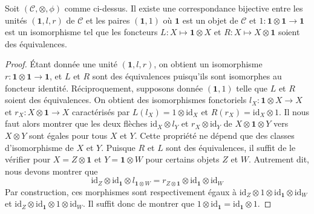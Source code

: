 \begin{lemma}
\label{lemma-monoidal-unit}
Soit $(\mathcal{C}, \otimes, \phi)$ comme ci-dessus. Il existe une
correspondance bijective entre les unités $(\mathbf{1}, l, r)$ de $\mathcal{C}$
et les paires $(\mathbf{1}, 1)$ où $\mathbf{1}$ est un objet de $\mathcal{C}$ et
$1 : \mathbf{1} \otimes \mathbf{1} \to \mathbf{1}$
est un isomorphisme tel que les foncteurs
$L : X \mapsto \mathbf{1} \otimes X$
et $R : X \mapsto X \otimes \mathbf{1}$ soient des équivalences.
\end{lemma}

\begin{proof}
Étant donnée une unité $(\mathbf{1}, l, r)$, on obtient un isomorphisme
$r : \mathbf{1} \otimes \mathbf{1} \to \mathbf{1}$, et $L$ et $R$ sont
des équivalences puisqu'ils sont isomorphes au foncteur identité.
Réciproquement, supposons donnée $(\mathbf{1}, 1)$ telle que
$L$ et $R$ soient des équivalences. On obtient des isomorphismes fonctoriels
$l_X : \mathbf{1} \otimes X \to X$ et $r_X : X \otimes \mathbf{1} \to X$
caractérisés par $L(l_X) = 1 \otimes \text{id}_X$ et
$R(r_X) = \text{id}_X \otimes 1$. Il nous faut alors montrer que les deux
flèches $\text{id}_X \otimes l_Y$ et $r_X \otimes \text{id}_Y$ de
$X \otimes \mathbf{1} \otimes Y$ vers $X \otimes Y$ sont égales
pour tous $X$ et $Y$. Cette propriété ne dépend que des classes d'isomorphisme
de $X$ et $Y$.
Puisque $R$ et $L$ sont des équivalences, il suffit de
le vérifier pour $X = Z \otimes \mathbf{1}$ et $Y = \mathbf{1} \otimes W$
pour certains objets $Z$ et $W$.
Autrement dit, nous devons montrer que
$$
\text{id}_Z \otimes \text{id}_\mathbf{1} \otimes l_{\mathbf{1} \otimes W}
=
r_{Z \otimes \mathbf{1}} \otimes \text{id}_\mathbf{1} \otimes \text{id}_W
$$
Par construction, ces morphismes sont respectivement égaux à
$\text{id}_Z \otimes 1 \otimes \text{id}_\mathbf{1} \otimes \text{id}_W$ et
$\text{id}_Z \otimes \text{id}_\mathbf{1} \otimes 1 \otimes \text{id}_W$.
Il suffit donc de montrer que
$1 \otimes \text{id}_\mathbf{1} = \text{id}_\mathbf{1} \otimes 1$.


\end{proof}
